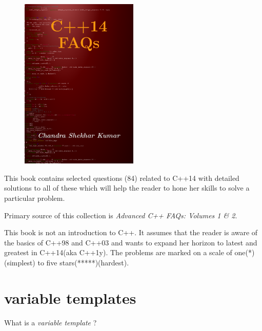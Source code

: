 
\begin{figure}
  \begin{center}
    \includegraphics[width=0.5\textwidth]{cpp14faqs/cover}
  \end{center}
\end{figure}

This book contains selected questions (84) related to C++14 with detailed solutions to all of these which will help the reader to hone her skills to solve a particular problem.

Primary source of this collection is \emph{Advanced C++ FAQs: Volumes 1 \& 2}.

This book is not an introduction to C++. It assumes that the reader is aware of the basics of C++98 and C++03 and wants to expand her horizon to latest and greatest in C++14(aka C++1y). The problems are marked on a scale of one(*)(simplest) to five stars(*****)(hardest).



\section{variable templates}


\begin{Exercise}[title={variable template}, difficulty=3, label=ex01]
What is a \emph{variable template} ?
\end{Exercise}



